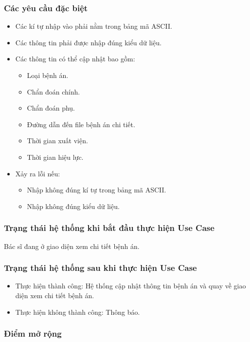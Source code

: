 \subsubsection{Các yêu cầu đặc biệt}
\begin{itemize}
    \item Các kí tự nhập vào phải nằm trong bảng mã ASCII.
    \item Các thông tin phải được nhập đúng kiểu dữ liệu.
    \item Các thông tin có thể cập nhật bao gồm:
    \begin{itemize}
        \item Loại bệnh án.
        \item Chẩn đoán chính.
        \item Chẩn đoán phụ.
        \item Đường dẫn đến file bệnh án chi tiết.
        \item Thời gian xuất viện.
        \item Thời gian hiệu lực.
    \end{itemize}
    \item Xảy ra lỗi nếu:
    \begin{itemize}
        \item Nhập không đúng kí tự trong bảng mã ASCII.
        \item Nhập không đúng kiểu dữ liệu.
    \end{itemize}
\end{itemize}

\subsubsection{Trạng thái hệ thống khi bắt đầu thực hiện Use Case}
Bác sĩ đang ở giao diện xem chi tiết bệnh án.

\subsubsection{Trạng thái hệ thống sau khi thực hiện Use Case}
\begin{itemize}
    \item Thực hiện thành công: Hệ thống cập nhật thông tin bệnh án và quay về giao diện xem chi tiết bệnh án.
    \item Thực hiện không thành công: Thông báo.
\end{itemize}

\subsubsection{Điểm mở rộng}